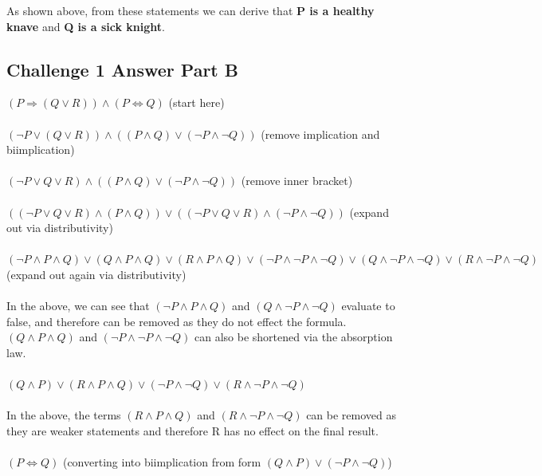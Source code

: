 \documentclass[12pt]{article}
\newcommand{\impl}{\mathbin{\Rightarrow}}
\newcommand{\biim}{\mathbin{\Leftrightarrow}}
\newcommand\tab[1][1cm]{\hspace*{#1}}
\begin{document}
As shown above, from these statements we can derive that \textbf{P is a healthy knave} and \textbf{Q is a sick knight}.
\pagebreak
\subsection*{Challenge 1 Answer Part B}
$(P \impl (Q \lor R)) \land (P \biim Q)$ \tab (start here) \\\\
$(\neg P \lor (Q \lor R)) \land ((P \land Q) \lor (\neg P \land \neg Q))$ \tab (remove implication and biimplication) \\\\
$(\neg P \lor Q \lor R) \land ((P \land Q) \lor (\neg P \land \neg Q))$ \tab (remove inner bracket) \\\\
$ ((\neg P \lor Q \lor R) \land (P \land Q )) \lor ((\neg P \lor Q \lor R) \land (\neg P \land \neg Q))$ \tab (expand out via distributivity) \\\\
$ (\neg P \land P \land Q) \lor (Q \land P \land Q) \lor (R \land P \land Q) \lor (\neg P \land \neg P \land \neg Q) \lor (Q \land \neg P \land \neg Q) \lor (R \land \neg P \land \neg Q)$ \tab (expand out again via distributivity) \\\\
In the above, we can see that $(\neg P \land P \land Q)$ and $(Q \land \neg P \land \neg Q)$ evaluate to false, and therefore can be removed as they do not effect the formula. $(Q \land P \land Q)$ and $(\neg P \land \neg P \land \neg Q)$ can also be shortened via the absorption law.\\\\
$(Q \land P) \lor (R \land P \land Q) \lor (\neg P \land \neg Q) \lor (R \land \neg P \land \neg Q)$ \\\\
In the above, the terms $(R \land P \land Q)$ and $(R \land \neg P \land \neg Q)$ can be removed as they are weaker statements and therefore R has no effect on the final result.\\\\
$(P \biim Q)$ \tab (converting into biimplication from form $(Q \land P) \lor (\neg P \land \neg Q)$)\\\\
\end{document}
